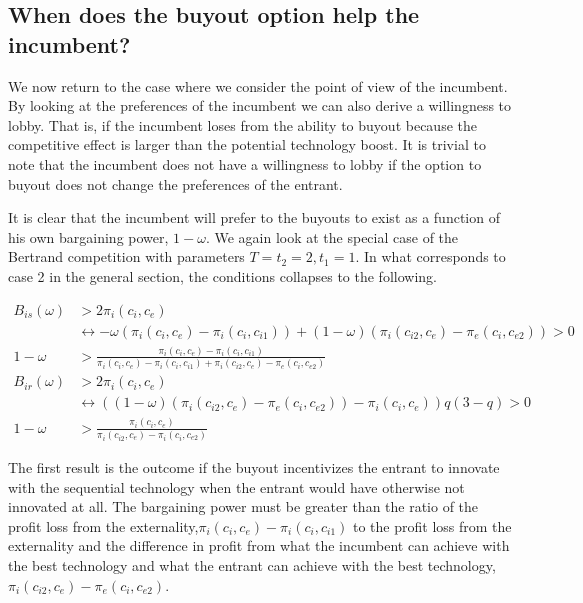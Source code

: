 \documentclass[11pt]{article}
\begin{document}
\subsection{When does the buyout option help the incumbent?}

We now return to the case where we consider the point of view of the incumbent. By looking at the preferences of the incumbent we can also derive a willingness to lobby. That is, if the incumbent loses from the ability to buyout because the competitive effect is larger than the potential technology boost. It is trivial to note that the incumbent does not have a willingness to lobby if the option to buyout does not change the preferences of the entrant. 

It is clear that the incumbent will prefer to the buyouts to exist as a function of his own bargaining power, $1-\omega$. We again look at the special case of the Bertrand competition with parameters $T=t_2=2,t_1=1$. In what corresponds to case 2 in the general section, the conditions collapses to the following. 

\begin{align*}
B_{is}(\omega)&>2 \pi_i(c_i,c_e) \\
& \leftrightarrow -\omega(\pi_i(c_i,c_{e})- \pi_i(c_i,c_{i1})) 
+(1-\omega)(\pi_i(c_{i2},c_e)-\pi_e(c_{i},c_{e2})) >0 \\
1-\omega &> \frac{\pi_i(c_i,c_{e})- \pi_i(c_i,c_{i1})}{\pi_i(c_i,c_{e})- \pi_i(c_i,c_{i1})+\pi_i(c_{i2},c_e)-\pi_e(c_{i},c_{e2})}
\\
B_{ir}(\omega)&>2 \pi_i(c_i,c_e) \\
& \leftrightarrow ((1-\omega)(\pi_{i}(c_{i2},c_{e})-\pi_{e}(c_{i},c_{e2}))-\pi_i(c_i,c_e)) q(3-q)>0 \\
1-\omega&>\frac{\pi_i(c_i,c_e)}{\pi_i(c_{i2},c_e)-\pi_i(c_{i},c_{e2})}
\end{align*}

The first result is the outcome if the buyout incentivizes the entrant to innovate with the sequential technology when the entrant would have otherwise not innovated at all. The bargaining power must be greater than the ratio of the profit loss from the externality,$\pi_i(c_i,c_{e})- \pi_i(c_i,c_{i1})$ to the profit loss from the externality and the difference in profit from what the incumbent can achieve with the best technology and what the entrant can achieve with the best technology,$\pi_i(c_{i2},c_e)-\pi_e(c_{i},c_{e2})$. 
\end{document}
